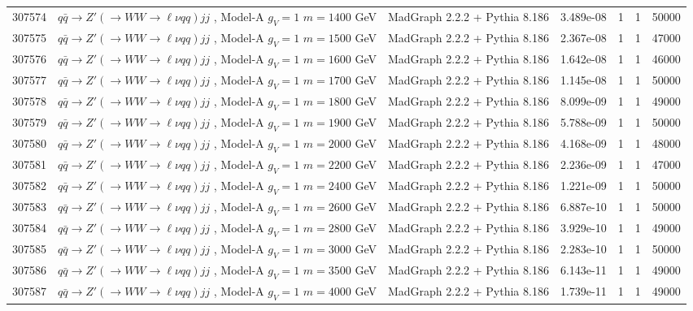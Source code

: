 \begin{landscape}
\begin{table}[!htb]
\begin{footnotesize}
\begin{center}
\begin{tabular}{|c|l|c|c|c|c|r|}
					307574 & $q\bar{q} \to Z'\left(\to WW \to \ell\nu qq\right) jj$ , Model-A $g_V=1$ $m=1400$ GeV& MadGraph 2.2.2 + Pythia 8.186 & 3.489e-08 & 1 & 1 & 50000 \\
					307575 & $q\bar{q} \to Z'\left(\to WW \to \ell\nu qq\right) jj$ , Model-A $g_V=1$ $m=1500$ GeV& MadGraph 2.2.2 + Pythia 8.186 & 2.367e-08 & 1 & 1 & 47000 \\
					307576 & $q\bar{q} \to Z'\left(\to WW \to \ell\nu qq\right) jj$ , Model-A $g_V=1$ $m=1600$ GeV& MadGraph 2.2.2 + Pythia 8.186 & 1.642e-08 & 1 & 1 & 46000 \\
					307577 & $q\bar{q} \to Z'\left(\to WW \to \ell\nu qq\right) jj$ , Model-A $g_V=1$ $m=1700$ GeV& MadGraph 2.2.2 + Pythia 8.186 & 1.145e-08 & 1 & 1 & 50000 \\
					307578 & $q\bar{q} \to Z'\left(\to WW \to \ell\nu qq\right) jj$ , Model-A $g_V=1$ $m=1800$ GeV& MadGraph 2.2.2 + Pythia 8.186 & 8.099e-09 & 1 & 1 & 49000 \\
					307579 & $q\bar{q} \to Z'\left(\to WW \to \ell\nu qq\right) jj$ , Model-A $g_V=1$ $m=1900$ GeV& MadGraph 2.2.2 + Pythia 8.186 & 5.788e-09 & 1 & 1 & 50000 \\
					307580 & $q\bar{q} \to Z'\left(\to WW \to \ell\nu qq\right) jj$ , Model-A $g_V=1$ $m=2000$ GeV& MadGraph 2.2.2 + Pythia 8.186 & 4.168e-09 & 1 & 1 & 48000 \\
					307581 & $q\bar{q} \to Z'\left(\to WW \to \ell\nu qq\right) jj$ , Model-A $g_V=1$ $m=2200$ GeV& MadGraph 2.2.2 + Pythia 8.186 & 2.236e-09 & 1 & 1 & 47000 \\
					307582 & $q\bar{q} \to Z'\left(\to WW \to \ell\nu qq\right) jj$ , Model-A $g_V=1$ $m=2400$ GeV& MadGraph 2.2.2 + Pythia 8.186 & 1.221e-09 & 1 & 1 & 50000 \\
					307583 & $q\bar{q} \to Z'\left(\to WW \to \ell\nu qq\right) jj$ , Model-A $g_V=1$ $m=2600$ GeV& MadGraph 2.2.2 + Pythia 8.186 & 6.887e-10 & 1 & 1 & 50000 \\
					307584 & $q\bar{q} \to Z'\left(\to WW \to \ell\nu qq\right) jj$ , Model-A $g_V=1$ $m=2800$ GeV& MadGraph 2.2.2 + Pythia 8.186 & 3.929e-10 & 1 & 1 & 49000 \\
					307585 & $q\bar{q} \to Z'\left(\to WW \to \ell\nu qq\right) jj$ , Model-A $g_V=1$ $m=3000$ GeV& MadGraph 2.2.2 + Pythia 8.186 & 2.283e-10 & 1 & 1 & 50000 \\
					307586 & $q\bar{q} \to Z'\left(\to WW \to \ell\nu qq\right) jj$ , Model-A $g_V=1$ $m=3500$ GeV& MadGraph 2.2.2 + Pythia 8.186 & 6.143e-11 & 1 & 1 & 49000 \\
					307587 & $q\bar{q} \to Z'\left(\to WW \to \ell\nu qq\right) jj$ , Model-A $g_V=1$ $m=4000$ GeV& MadGraph 2.2.2 + Pythia 8.186 & 1.739e-11 & 1 & 1 & 49000 \\
					\hline
				\end{tabular}
			\end{center}
		\end{footnotesize}
	\end{table}
	

\end{landscape}
